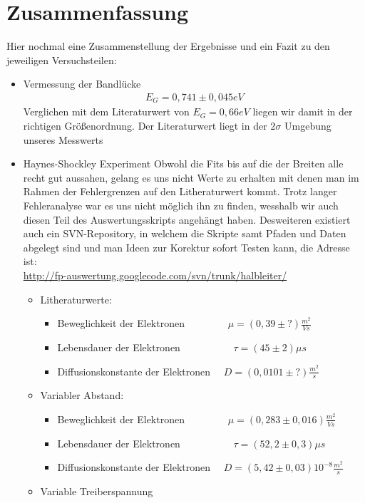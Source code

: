 \documentclass[12pt]{article}
\begin{document}
\section{Zusammenfassung}
Hier nochmal eine Zusammenstellung der Ergebnisse und ein Fazit zu den jeweiligen Versuchsteilen:
\begin{itemize}
 \item Vermessung der Bandlücke
\begin{align*}
 E_G = 0,741 \pm 0,045 eV
\end{align*}
Verglichen mit dem Literaturwert von $E_G = 0,66 eV$ liegen wir damit in der richtigen Größenordnung. Der Literaturwert liegt in der $2\sigma$ Umgebung unseres Messwerts
\item Haynes-Shockley Experiment
Obwohl die Fits bis auf die der Breiten alle recht gut aussahen, gelang es uns nicht Werte zu erhalten mit denen man im Rahmen der Fehlergrenzen auf den Litheraturwert kommt. Trotz langer Fehleranalyse war es uns nicht möglich ihn zu finden, wesshalb wir auch diesen Teil des Auswertungsskripts angehängt haben. Desweiteren existiert auch ein SVN-Repository, in welchem die Skripte samt Pfaden und Daten abgelegt sind und man Ideen zur Korektur sofort Testen kann, die Adresse ist: \\ \url{http://fp-auswertung.googlecode.com/svn/trunk/halbleiter/}
\begin{itemize}
\item Litheraturwerte:
\begin{itemize}
 \item Beweglichkeit der Elektronen ~~~~~~~~$\mu = (0,39 \pm ?) \frac{m^2}{Vs}$ 
 \item Lebensdauer der Elektronen ~~~~~~~~~~$\tau = (45 \pm 2) \mu s $
 \item Diffusionskonstante der Elektronen ~~$D = (0,0101 \pm ?) \frac{m^2}{s}$
\end{itemize}
\item Variabler Abstand:
\begin{itemize}
 \item Beweglichkeit der Elektronen ~~~~~~~~$\mu = (0,283 \pm 0,016) \frac{m^2}{Vs}$ 
 \item Lebensdauer der Elektronen ~~~~~~~~~~$\tau = (52,2 \pm 0,3) \mu s $
 \item Diffusionskonstante der Elektronen ~~$D = (5,42 \pm 0,03) 10^{-8} \frac{m^2}{s}$
\end{itemize}
\item Variable Treiberspannung
\begin{itemize}

\end{itemize}
\end{itemize}
\end{itemize}
\end{document}

